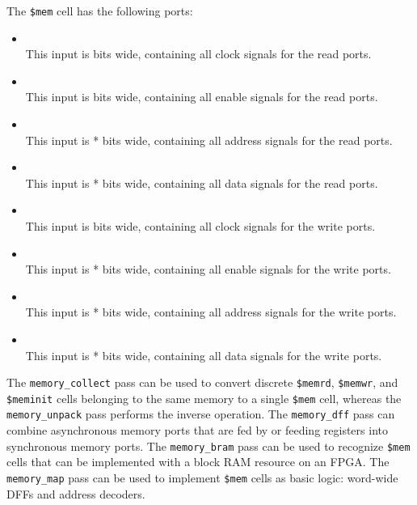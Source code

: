 The {\tt \$mem} cell has the following ports:

\begin{itemize}
\item {} \\
This input is  bits wide, containing all clock signals for the read ports.

\item {} \\
This input is  bits wide, containing all enable signals for the read ports.

\item {} \\
This input is * bits wide, containing all address signals for the read ports.

\item {} \\
This input is * bits wide, containing all data signals for the read ports.

\item {} \\
This input is  bits wide, containing all clock signals for the write ports.

\item {} \\
This input is * bits wide, containing all enable signals for the write ports.

\item {} \\
This input is * bits wide, containing all address signals for the write ports.

\item {} \\
This input is * bits wide, containing all data signals for the write ports.
\end{itemize}

The {\tt memory\_collect} pass can be used to convert discrete {\tt \$memrd}, {\tt \$memwr}, and {\tt \$meminit} cells
belonging to the same memory to a single {\tt \$mem} cell, whereas the {\tt memory\_unpack} pass performs the inverse operation.
The {\tt memory\_dff} pass can combine asynchronous memory ports that are fed by or feeding registers into synchronous memory ports.
The {\tt memory\_bram} pass can be used to recognize {\tt \$mem} cells that can be implemented with a block RAM resource on an FPGA.
The {\tt memory\_map} pass can be used to implement {\tt \$mem} cells as basic logic: word-wide DFFs and address decoders.

